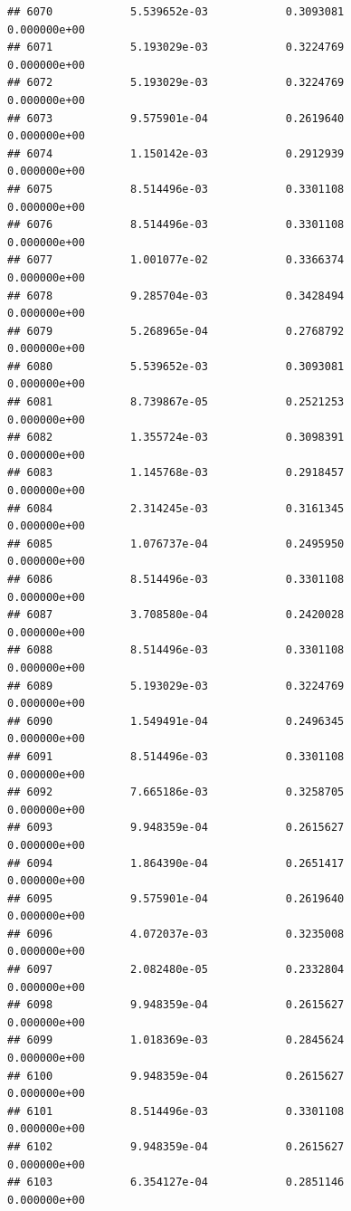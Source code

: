 \documentclass[
]{article}
\begin{document}
\begin{verbatim}
## 6070            5.539652e-03            0.3093081            0.000000e+00
## 6071            5.193029e-03            0.3224769            0.000000e+00
## 6072            5.193029e-03            0.3224769            0.000000e+00
## 6073            9.575901e-04            0.2619640            0.000000e+00
## 6074            1.150142e-03            0.2912939            0.000000e+00
## 6075            8.514496e-03            0.3301108            0.000000e+00
## 6076            8.514496e-03            0.3301108            0.000000e+00
## 6077            1.001077e-02            0.3366374            0.000000e+00
## 6078            9.285704e-03            0.3428494            0.000000e+00
## 6079            5.268965e-04            0.2768792            0.000000e+00
## 6080            5.539652e-03            0.3093081            0.000000e+00
## 6081            8.739867e-05            0.2521253            0.000000e+00
## 6082            1.355724e-03            0.3098391            0.000000e+00
## 6083            1.145768e-03            0.2918457            0.000000e+00
## 6084            2.314245e-03            0.3161345            0.000000e+00
## 6085            1.076737e-04            0.2495950            0.000000e+00
## 6086            8.514496e-03            0.3301108            0.000000e+00
## 6087            3.708580e-04            0.2420028            0.000000e+00
## 6088            8.514496e-03            0.3301108            0.000000e+00
## 6089            5.193029e-03            0.3224769            0.000000e+00
## 6090            1.549491e-04            0.2496345            0.000000e+00
## 6091            8.514496e-03            0.3301108            0.000000e+00
## 6092            7.665186e-03            0.3258705            0.000000e+00
## 6093            9.948359e-04            0.2615627            0.000000e+00
## 6094            1.864390e-04            0.2651417            0.000000e+00
## 6095            9.575901e-04            0.2619640            0.000000e+00
## 6096            4.072037e-03            0.3235008            0.000000e+00
## 6097            2.082480e-05            0.2332804            0.000000e+00
## 6098            9.948359e-04            0.2615627            0.000000e+00
## 6099            1.018369e-03            0.2845624            0.000000e+00
## 6100            9.948359e-04            0.2615627            0.000000e+00
## 6101            8.514496e-03            0.3301108            0.000000e+00
## 6102            9.948359e-04            0.2615627            0.000000e+00
## 6103            6.354127e-04            0.2851146            0.000000e+00

\end{verbatim}
\end{document}
